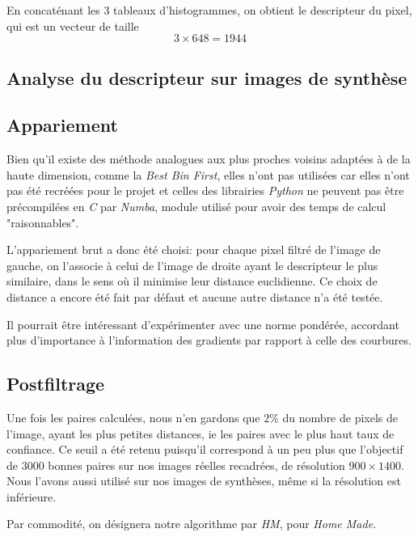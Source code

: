 \documentclass[
	a4paper, %
	10pt, %
	unnumberedsections, %
	twoside, %
]{LTJournalArticle}
\begin{document}
En concaténant les $3$ tableaux d'histogrammes, on obtient le descripteur du pixel,
qui est un vecteur de taille $$3 \times 648 = 1944$$

\subsection{Analyse du descripteur sur images de synthèse}


\subsection{Appariement}

Bien qu'il existe des méthode analogues aux plus proches voisins adaptées à de la haute dimension,
comme la \textit{Best Bin First}, elles n'ont pas utilisées car elles n'ont
pas été recréées pour le projet et celles des librairies \textit{Python} ne peuvent pas être
précompilées en \textit{C} par \textit{Numba}, module utilisé pour avoir des temps
de calcul "raisonnables".

L'appariement brut a donc été choisi: pour chaque pixel filtré de l'image de gauche,
on l'associe à celui de l'image de droite ayant le descripteur le plus similaire,
dans le sens où il minimise leur distance euclidienne.
Ce choix de distance a encore été fait par défaut et aucune autre distance
n'a été testée.

Il pourrait être intéressant d'expérimenter avec une norme pondérée, accordant plus d'importance
à l'information des gradients par rapport à celle des courbures.

\subsection{Postfiltrage}
Une fois les paires calculées, nous n'en gardons que $2 \%$ du nombre de pixels de l'image,
ayant les plus petites distances, ie les paires avec le plus haut taux
de confiance. Ce seuil a été retenu puisqu'il correspond à un peu plus que
l'objectif de $3000$ bonnes paires sur nos images réelles recadrées, de résolution
$900 \times 1400$.
Nous l'avons aussi utilisé sur nos images de synthèses, même si la résolution est inférieure.

Par commodité, on désignera notre algorithme
par \textit{HM}, pour \textit{Home Made}.

\end{document}
